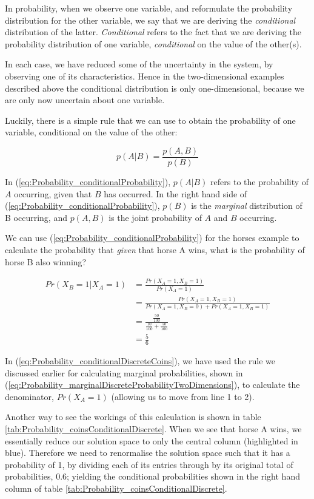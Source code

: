 \documentclass[11pt,fullpage]{book}
\begin{document}
In probability, when we observe one variable, and reformulate the probability distribution for the other variable, we say that we are deriving the \textit{conditional} distribution of the latter. \textit{Conditional} refers to the fact that we are deriving the probability distribution of one variable, \textit{conditional} on the value of the other(s).

In each case, we have reduced some of the uncertainty in the system, by observing one of its characteristics. Hence in the two-dimensional examples described above the conditional distribution is only one-dimensional, because we are only now uncertain about one variable. 

Luckily, there is a simple rule that we can use to obtain the probability of one variable, conditional on the value of the other:

\begin{equation}\label{eq:Probability_conditionalProbability}
p(A|B) = \frac{p(A,B)}{p(B)}
\end{equation}

In (\ref{eq:Probability_conditionalProbability}), $p(A|B)$ refers to the probability of $A$ occurring, given that $B$ has occurred. In the right hand side of (\ref{eq:Probability_conditionalProbability}), $p(B)$ is the \textit{marginal} distribution of B occurring, and $p(A,B)$ is the joint probability of $A$ and $B$ occurring.

We can use (\ref{eq:Probability_conditionalProbability}) for the horses example to calculate the probability that \textit{given} that horse A wins, what is the probability of horse B also winning?

\begin{align}\label{eq:Probability_conditionalDiscreteCoins}
Pr(X_B=1|X_A=1) &= \frac{Pr(X_A=1,X_B=1)}{Pr(X_A=1)}\\
&= \frac{Pr(X_A=1,X_B=1)}{Pr(X_A=1,X_B=0)+Pr(X_A=1,X_B=1)}\\
&= \frac{\frac{50}{100}}{\frac{10}{100} + \frac{50}{100}}\\ 
&= \frac{5}{6}
\end{align}


In (\ref{eq:Probability_conditionalDiscreteCoins}), we have used the rule we discussed earlier for calculating marginal probabilities, shown in (\ref{eq:Probability_marginalDiscreteProbabilityTwoDimensions}), to calculate the denominator, $Pr(X_A=1)$ (allowing us to move from line 1 to 2).

Another way to see the workings of this calculation is shown in table \ref{tab:Probability_coinsConditionalDiscrete}. When we see that horse A wins, we essentially reduce our solution space to only the central column (highlighted in blue). Therefore we need to renormalise the solution space such that it has a probability of 1, by dividing each of its entries through by its original total of probabilities, 0.6; yielding the conditional probabilities shown in the right hand column of table \ref{tab:Probability_coinsConditionalDiscrete}.
\end{document}
